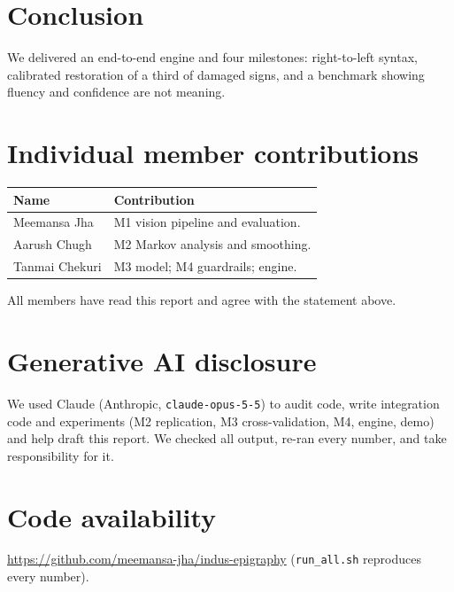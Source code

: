\documentclass[11pt,a4paper,twocolumn]{article}
\newcommand{\githuburl}{https://github.com/meemansa-jha/indus-epigraphy}
\begin{document}
\section{Conclusion}
We delivered an end-to-end engine and four milestones: right-to-left syntax, calibrated restoration
of a third of damaged signs, and a benchmark showing fluency and confidence are not meaning.

\section*{Individual member contributions}
{\small
\begin{tabularx}{\linewidth}{@{}l X@{}}
\toprule
Name & Contribution \\
\midrule
Meemansa Jha & M1 vision pipeline and evaluation. \\
Aarush Chugh & M2 Markov analysis and smoothing. \\
Tanmai Chekuri & M3 model; M4 guardrails; engine. \\
\bottomrule
\end{tabularx}}

\smallskip
\noindent All members have read this report and agree with the statement above.

\section*{Generative AI disclosure}
We used Claude (Anthropic, \texttt{claude-opus-5-5}) to audit code, write integration code and
experiments (M2 replication, M3 cross-validation, M4, engine, demo) and help draft this report. We
checked all output, re-ran every number, and take responsibility for it.

\section*{Code availability}
\noindent \url{\githuburl} (\texttt{run\_all.sh} reproduces every number).
\end{document}
